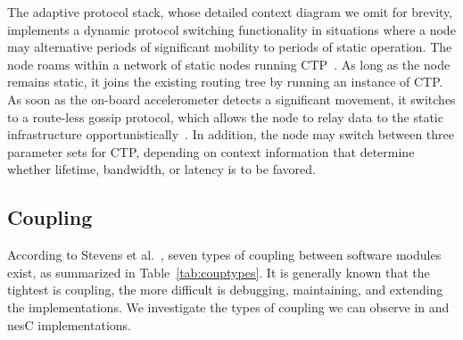 The adaptive protocol stack, whose detailed context diagram we omit
for brevity, implements a dynamic protocol switching functionality in
situations where a node may alternative periods of significant
mobility to periods of static operation. The node roams within a
network of static nodes running CTP~\cite{gnawali09}. As long as the
node remains static, it joins the existing routing tree by running an
instance of CTP. As soon as the on-board accelerometer detects a
significant movement, it switches to a route-less gossip protocol,
which allows the node to relay data to the static infrastructure
opportunistically~\cite{Fotouhi:2012:SRH:2187181.2187193}. In
addition, the node may switch between three parameter sets for CTP,
depending on context information that determine whether lifetime,
bandwidth, or latency is to be favored.



\subsection{Coupling}\label{sec:evalcomp}

According to Stevens et al.~\cite{stevens79}, seven types of coupling
between software modules exist, as summarized in
Table~\ref{tab:couptypes}. It is generally known that the tightest is
coupling, the more difficult is debugging, maintaining, and extending
the implementations. %
We investigate the types of coupling we can observe in \conesc and
nesC implementations.

